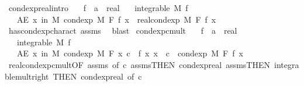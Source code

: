 \begin{isabellebody}
\isanewline
{}\isamarkupfalse%
\ cond{\isacharunderscore}{\kern0pt}exp{\isacharunderscore}{\kern0pt}real{\isacharbrackleft}{\kern0pt}intro{\isacharbrackright}{\kern0pt}{\isacharcolon}{\kern0pt}\isanewline
\ \ \ f\ {\isacharcolon}{\kern0pt}{\isacharcolon}{\kern0pt}\ {\isachardoublequoteopen}{\isacharprime}{\kern0pt}a\ {\isasymRightarrow}\ real{\isachardoublequoteclose}\isanewline
\ \ \ {\isachardoublequoteopen}integrable\ M\ f{\isachardoublequoteclose}\isanewline
\ \ \ {\isachardoublequoteopen}AE\ x\ in\ M{\isachardot}{\kern0pt}\ cond{\isacharunderscore}{\kern0pt}exp\ M\ F\ f\ x\ {\isacharequal}{\kern0pt}\ real{\isacharunderscore}{\kern0pt}cond{\isacharunderscore}{\kern0pt}exp\ M\ F\ f\ x{\isachardoublequoteclose}\ \isanewline
%
\isadelimproof
\ \ %
\endisadelimproof
%
\isatagproof
{}\isamarkupfalse%
\ has{\isacharunderscore}{\kern0pt}cond{\isacharunderscore}{\kern0pt}exp{\isacharunderscore}{\kern0pt}charact\ assms\ \isamarkupfalse%
\ blast%
\endisatagproof
{\isafoldproof}%
%
\isadelimproof
\isanewline
%
\endisadelimproof
\isanewline
{}\isamarkupfalse%
\ cond{\isacharunderscore}{\kern0pt}exp{\isacharunderscore}{\kern0pt}cmult{\isacharcolon}{\kern0pt}\isanewline
\ \ \ f\ {\isacharcolon}{\kern0pt}{\isacharcolon}{\kern0pt}\ {\isachardoublequoteopen}{\isacharprime}{\kern0pt}a\ {\isasymRightarrow}\ real{\isachardoublequoteclose}\isanewline
\ \ \ {\isachardoublequoteopen}integrable\ M\ f{\isachardoublequoteclose}\isanewline
\ \ \ {\isachardoublequoteopen}AE\ x\ in\ M{\isachardot}{\kern0pt}\ cond{\isacharunderscore}{\kern0pt}exp\ M\ F\ {\isacharparenleft}{\kern0pt}{\isasymlambda}x{\isachardot}{\kern0pt}\ c\ {\isacharasterisk}{\kern0pt}\ f\ x{\isacharparenright}{\kern0pt}\ x\ {\isacharequal}{\kern0pt}\ c\ {\isacharasterisk}{\kern0pt}\ cond{\isacharunderscore}{\kern0pt}exp\ M\ F\ f\ x{\isachardoublequoteclose}\isanewline
%
\isadelimproof
\ \ %
\endisadelimproof
%
\isatagproof
{}\isamarkupfalse%
\ real{\isacharunderscore}{\kern0pt}cond{\isacharunderscore}{\kern0pt}exp{\isacharunderscore}{\kern0pt}cmult{\isacharbrackleft}{\kern0pt}OF\ assms{\isacharparenleft}{\kern0pt}{}{\isacharparenright}{\kern0pt}{\isacharcomma}{\kern0pt}\ of\ c{\isacharbrackright}{\kern0pt}\ assms{\isacharparenleft}{\kern0pt}{}{\isacharparenright}{\kern0pt}{\isacharbrackleft}{\kern0pt}THEN\ cond{\isacharunderscore}{\kern0pt}exp{\isacharunderscore}{\kern0pt}real{\isacharbrackright}{\kern0pt}\ assms{\isacharparenleft}{\kern0pt}{}{\isacharparenright}{\kern0pt}{\isacharbrackleft}{\kern0pt}THEN\ integrable{\isacharunderscore}{\kern0pt}mult{\isacharunderscore}{\kern0pt}right{\isacharcomma}{\kern0pt}\ THEN\ cond{\isacharunderscore}{\kern0pt}exp{\isacharunderscore}{\kern0pt}real{\isacharcomma}{\kern0pt}\ of\ c{\isacharbrackright}{\kern0pt}\ \isamarkupfalse%

\end{isabellebody}
